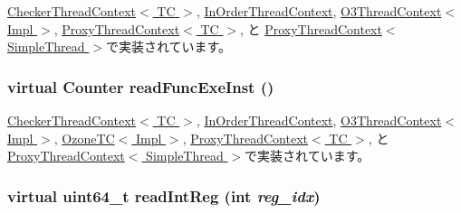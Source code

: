 \hyperlink{classCheckerThreadContext_aaa32dc9f4a8719a465c267fed47cbdc6}{CheckerThreadContext$<$ TC $>$}, \hyperlink{classInOrderThreadContext_aaa32dc9f4a8719a465c267fed47cbdc6}{InOrderThreadContext}, \hyperlink{classO3ThreadContext_abdeceb5c5aac44f73966cdb8a588d5d5}{O3ThreadContext$<$ Impl $>$}, \hyperlink{classProxyThreadContext_aaa32dc9f4a8719a465c267fed47cbdc6}{ProxyThreadContext$<$ TC $>$}, と \hyperlink{classProxyThreadContext_aaa32dc9f4a8719a465c267fed47cbdc6}{ProxyThreadContext$<$ SimpleThread $>$}で実装されています。\hypertarget{classThreadContext_ae9aa32b63846c7bae5f2b6d899bdbf9c}{
\subsubsection[{readFuncExeInst}]{\setlength{\rightskip}{0pt plus 5cm}virtual {\bf Counter} readFuncExeInst ()}}
\label{classThreadContext_ae9aa32b63846c7bae5f2b6d899bdbf9c}


\hyperlink{classCheckerThreadContext_a2b0bef6e1b1ac24e9322fbd09a511d11}{CheckerThreadContext$<$ TC $>$}, \hyperlink{classInOrderThreadContext_a2b0bef6e1b1ac24e9322fbd09a511d11}{InOrderThreadContext}, \hyperlink{classO3ThreadContext_a73cff115f1db487a2b2e2cb162035cf5}{O3ThreadContext$<$ Impl $>$}, \hyperlink{classOzoneCPU_1_1OzoneTC_a2b0bef6e1b1ac24e9322fbd09a511d11}{OzoneTC$<$ Impl $>$}, \hyperlink{classProxyThreadContext_a2b0bef6e1b1ac24e9322fbd09a511d11}{ProxyThreadContext$<$ TC $>$}, と \hyperlink{classProxyThreadContext_a2b0bef6e1b1ac24e9322fbd09a511d11}{ProxyThreadContext$<$ SimpleThread $>$}で実装されています。\hypertarget{classThreadContext_af80734776d68e6acd48e22f6c999394a}{
\subsubsection[{readIntReg}]{\setlength{\rightskip}{0pt plus 5cm}virtual uint64\_\-t readIntReg (int {\em reg\_\-idx})}}
\label{classThreadContext_af80734776d68e6acd48e22f6c999394a}



